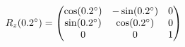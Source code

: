 \documentclass[preview]{standalone}
\begin{document}
\begin{align*}
\special{dvisvgm:raw <g id='unique000'>}R_z(0.2^\circ) = \begin{pmatrix} \cos(0.2^\circ) & -\sin(0.2^\circ) & 0 \\ \sin(0.2^\circ) & \cos(0.2^\circ) & 0 \\ 0 & 0 & 1 \end{pmatrix}\special{dvisvgm:raw </g>}
\end{align*}
\end{document}
